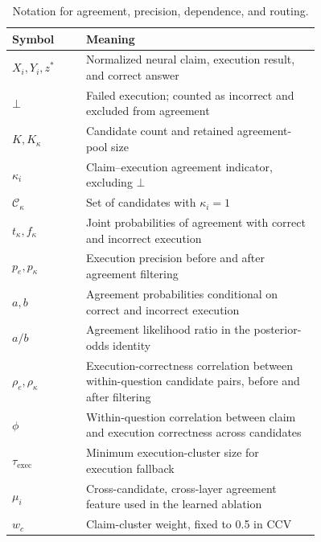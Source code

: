 \documentclass{article}
\begin{document}
\begin{table}[h]
\centering
\caption{Notation for agreement, precision, dependence, and routing.}
\label{tab:notation}
\small
\begin{tabular}{lp{0.76\linewidth}}
\toprule
Symbol & Meaning \\
\midrule
$X_i,Y_i,z^*$ & Normalized neural claim, execution result, and correct answer \\
$\bot$ & Failed execution; counted as incorrect and excluded from agreement \\
$K,K_\kappa$ & Candidate count and retained agreement-pool size \\
$\kappa_i$ & Claim--execution agreement indicator, excluding $\bot$ \\
$\mathcal C_\kappa$ & Set of candidates with $\kappa_i=1$ \\
$t_\kappa,f_\kappa$ & Joint probabilities of agreement with correct and incorrect execution \\
$p_e,p_\kappa$ & Execution precision before and after agreement filtering \\
$a,b$ & Agreement probabilities conditional on correct and incorrect execution \\
$a/b$ & Agreement likelihood ratio in the posterior-odds identity \\
$\rho_e,\rho_\kappa$ & Execution-correctness correlation between within-question candidate pairs, before and after filtering \\
$\phi$ & Within-question correlation between claim and execution correctness across candidates \\
$\tau_{\mathrm{exec}}$ & Minimum execution-cluster size for execution fallback \\
$\mu_i$ & Cross-candidate, cross-layer agreement feature used in the learned ablation \\
$w_c$ & Claim-cluster weight, fixed to 0.5 in CCV \\
\bottomrule
\end{tabular}
\end{table}

\clearpage

\end{document}
